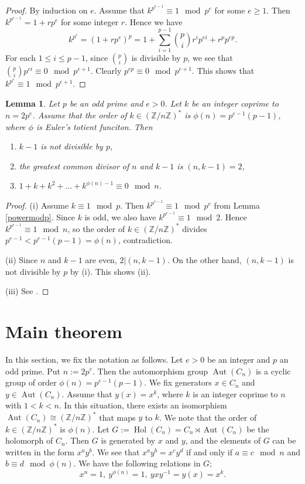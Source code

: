 \documentclass{amsart}
\newcommand{\bbz}{{\mathbb Z}}
\newtheorem{lem}[thm]{Lemma}
\begin{document}
\begin{proof}
By induction on $e$.
Assume that $k^{p^{e-1}} \equiv 1 \mod p^e$ for some $e \geq 1$.
Then $k^{p^{e-1}} = 1+ rp^e$ for some integer $r$.
Hence we have
\[ k^{p^e}=(1+rp^e)^p = 1+ \sum_{i=1}^{p-1} \binom{p}{i} r^ip^{ei} + r^p p^{ep}.\]
For each $1 \leq i \leq p-1$, since $\binom{p}{i}$ is divisible by $p$, we see that $\binom{p}{i}p^{ei} \equiv 0 \mod p^{e+1}$.
Clearly $p^{ep} \equiv 0 \mod p^{e+1}$.
This shows that $k^{p^e} \equiv 1 \mod p^{e+1}$.
\end{proof}

\begin{lem}\label{elnum}
Let $p$ be an odd prime and $e>0$.
Let $k$ be an integer coprime to $n=2p^e$.
Assume that the order of $k \in (\bbz/n\bbz)^*$ is $\phi(n)=p^{e-1}(p-1)$, where $\phi$ is Euler's totient funciton.
Then
\begin{enumerate}
\item[(i)] $k-1$ is not divisible by $p$, 
\item[(ii)] the greatest common divisor of $n$ and $k-1$ is $(n,k-1)=2$,
\item[(iii)] $1+k+k^2+\dots + k^{\phi(n)-1} \equiv 0 \mod n$.
\end{enumerate}
\end{lem}

\begin{proof}
(i)
Assume $k \equiv 1 \mod p$.
Then $k^{p^{e-1}} \equiv 1 \mod p^e$ from Lemma \ref{powermodp}.
Since $k$ is odd, we also have $k^{p^{e-1}} \equiv 1 \mod 2$.
Hence $k^{p^{e-1}} \equiv 1 \mod n$, so
the order of $k \in (\bbz/n\bbz)^*$ divides $p^{e-1}<p^{e-1}(p-1)=\phi(n)$, contradiction.

(ii)
Since $n$ and $k-1$ are even, $2|(n,k-1)$.
On the other hand, $(n,k-1)$ is not divisible by $p$ by (i).
This shows (ii).

(iii)
See \cite[Theorem 2.5]{svb}.
\end{proof}

\section{Main theorem}
In this section, we fix the notation as follows.
Let $e>0$ be an integer and $p$ an odd prime.
Put $n:= 2p^e$.
Then the automorphism group $\operatorname{Aut}(C_n)$ is a cyclic group of order $\phi(n)=p^{e-1}(p-1)$.
We fix generators $x \in C_n$ and $y \in \operatorname{Aut}(C_n)$.
Assume that $y(x)=x^k$, where $k$ is an integer coprime to $n$ with $1<k<n$.
In this situation, there exists an isomorphism $\operatorname{Aut}(C_n) \cong (\bbz / n\bbz)^*$ that maps $y$ to $k$.
We note that the order of $k \in (\bbz/n\bbz)^*$ is $\phi(n)$. 
Let $G:= \operatorname{Hol}(C_n) = C_n \rtimes \operatorname{Aut}(C_n)$ be the holomorph of $C_n$.
Then $G$ is generated by $x$ and $y$, and the elements of $G$ can be written in the form $x^a y^b$.
We see that $x^a y^b=x^c y^d$ if and only if $a \equiv c \mod n$ and $b \equiv d \mod \phi(n)$.
We have the following relations in $G$;
\[ x^n=1, \ y^{\phi(n)}=1, \ yxy^{-1}=y(x)=x^k.\]
\end{document}
